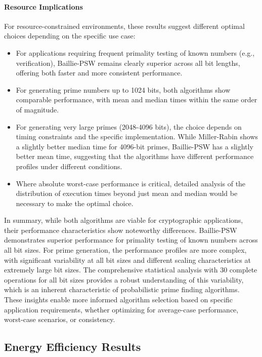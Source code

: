 \paragraph{Resource Implications}
For resource-constrained environments, these results suggest different optimal choices depending on the specific use case:
\begin{itemize}
    \item For applications requiring frequent primality testing of known numbers (e.g., verification), Baillie-PSW remains clearly superior across all bit lengths, offering both faster and more consistent performance.
    \item For generating prime numbers up to 1024 bits, both algorithms show comparable performance, with mean and median times within the same order of magnitude.
    \item For generating very large primes (2048-4096 bits), the choice depends on timing constraints and the specific implementation. While Miller-Rabin shows a slightly better median time for 4096-bit primes, Baillie-PSW has a slightly better mean time, suggesting that the algorithms have different performance profiles under different conditions.
    \item Where absolute worst-case performance is critical, detailed analysis of the distribution of execution times beyond just mean and median would be necessary to make the optimal choice.
\end{itemize}

In summary, while both algorithms are viable for cryptographic applications, their performance characteristics show noteworthy differences. Baillie-PSW demonstrates superior performance for primality testing of known numbers across all bit sizes. For prime generation, the performance profiles are more complex, with significant variability at all bit sizes and different scaling characteristics at extremely large bit sizes. The comprehensive statistical analysis with 30 complete operations for all bit sizes provides a robust understanding of this variability, which is an inherent characteristic of probabilistic prime finding algorithms. These insights enable more informed algorithm selection based on specific application requirements, whether optimizing for average-case performance, worst-case scenarios, or consistency.

\subsection{Energy Efficiency Results}

